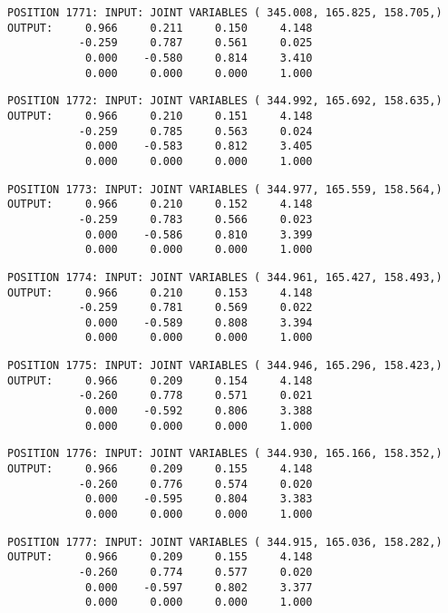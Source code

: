 \begin{verbatim}
POSITION 1771: INPUT: JOINT VARIABLES ( 345.008, 165.825, 158.705,)
OUTPUT:     0.966     0.211     0.150     4.148
           -0.259     0.787     0.561     0.025
            0.000    -0.580     0.814     3.410
            0.000     0.000     0.000     1.000
\end{verbatim} \pagebreak[1]\begin{verbatim}
POSITION 1772: INPUT: JOINT VARIABLES ( 344.992, 165.692, 158.635,)
OUTPUT:     0.966     0.210     0.151     4.148
           -0.259     0.785     0.563     0.024
            0.000    -0.583     0.812     3.405
            0.000     0.000     0.000     1.000
\end{verbatim} \pagebreak[1]\begin{verbatim}
POSITION 1773: INPUT: JOINT VARIABLES ( 344.977, 165.559, 158.564,)
OUTPUT:     0.966     0.210     0.152     4.148
           -0.259     0.783     0.566     0.023
            0.000    -0.586     0.810     3.399
            0.000     0.000     0.000     1.000
\end{verbatim} \pagebreak[1]\begin{verbatim}
POSITION 1774: INPUT: JOINT VARIABLES ( 344.961, 165.427, 158.493,)
OUTPUT:     0.966     0.210     0.153     4.148
           -0.259     0.781     0.569     0.022
            0.000    -0.589     0.808     3.394
            0.000     0.000     0.000     1.000
\end{verbatim} \pagebreak[1]\begin{verbatim}
POSITION 1775: INPUT: JOINT VARIABLES ( 344.946, 165.296, 158.423,)
OUTPUT:     0.966     0.209     0.154     4.148
           -0.260     0.778     0.571     0.021
            0.000    -0.592     0.806     3.388
            0.000     0.000     0.000     1.000
\end{verbatim} \pagebreak[1]\begin{verbatim}
POSITION 1776: INPUT: JOINT VARIABLES ( 344.930, 165.166, 158.352,)
OUTPUT:     0.966     0.209     0.155     4.148
           -0.260     0.776     0.574     0.020
            0.000    -0.595     0.804     3.383
            0.000     0.000     0.000     1.000
\end{verbatim} \pagebreak[1]\begin{verbatim}
POSITION 1777: INPUT: JOINT VARIABLES ( 344.915, 165.036, 158.282,)
OUTPUT:     0.966     0.209     0.155     4.148
           -0.260     0.774     0.577     0.020
            0.000    -0.597     0.802     3.377
            0.000     0.000     0.000     1.000
\end{verbatim} \pagebreak[1]\begin{verbatim}

\end{verbatim}
